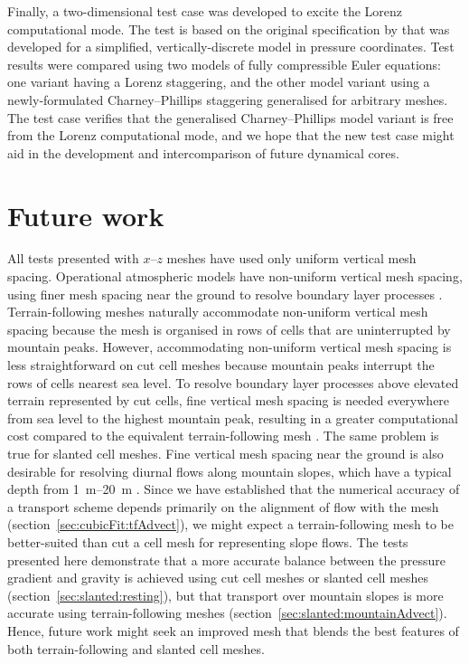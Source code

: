 Finally, a two-dimensional test case was developed to excite the Lorenz computational mode.
The test is based on the original specification by \citet{arakawa-konor1996} that was developed for a simplified, vertically-discrete model in pressure coordinates.
Test results were compared using two models of fully compressible Euler equations: one variant having a Lorenz staggering, and the other model variant using a newly-formulated Charney--Phillips staggering generalised for arbitrary meshes.
The test case verifies that the generalised Charney--Phillips model variant is free from the Lorenz computational mode, and we hope that the new test case might aid in the development and intercomparison of future dynamical cores.

\section{Future work}

All tests presented with $x$--$z$ meshes have used only uniform vertical mesh spacing.
Operational atmospheric models have non-uniform vertical mesh spacing, using finer mesh spacing near the ground to resolve boundary layer processes \citep[p. 547]{chow2013}.
Terrain-following meshes naturally accommodate non-uniform vertical mesh spacing because the mesh is organised in rows of cells that are uninterrupted by mountain peaks.
However, accommodating non-uniform vertical mesh spacing is less straightforward on cut cell meshes because mountain peaks interrupt the rows of cells nearest sea level.
To resolve boundary layer processes above elevated terrain represented by cut cells, fine vertical mesh spacing is needed everywhere from sea level to the highest mountain peak, resulting in a greater computational cost compared to the equivalent terrain-following mesh \citep{walko-avissar2008b}.
The same problem is true for slanted cell meshes.
Fine vertical mesh spacing near the ground is also desirable for resolving diurnal flows along mountain slopes, which have a typical depth from \SIrange{1}{20}{\meter} \citep[p. 39]{chow2013}.
Since we have established that the numerical accuracy of a transport scheme depends primarily on the alignment of flow with the mesh (section~\ref{sec:cubicFit:tfAdvect}), we might expect a terrain-following mesh to be better-suited than cut a cell mesh for representing slope flows.
The tests presented here demonstrate that a more accurate balance between the pressure gradient and gravity is achieved using cut cell meshes or slanted cell meshes (section~\ref{sec:slanted:resting}), but that transport over mountain slopes is more accurate using terrain-following meshes (section~\ref{sec:slanted:mountainAdvect}).
Hence, future work might seek an improved mesh that blends the best features of both terrain-following and slanted cell meshes.

